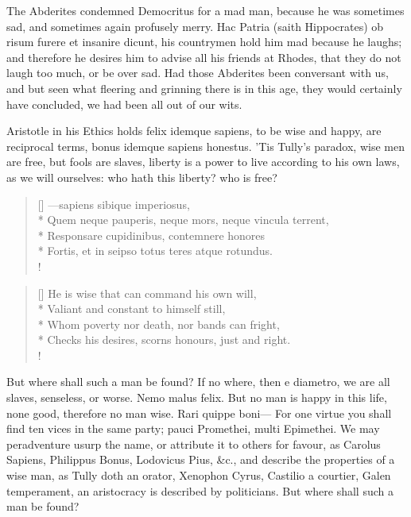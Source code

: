 {The Abderites condemned Democritus for a mad man, because he was
sometimes sad, and sometimes again profusely merry. Hac Patria (saith
Hippocrates) ob risum furere et insanire dicunt, his countrymen hold
him mad because he laughs; and therefore he desires him to advise
all his friends at Rhodes, that they do not laugh too much, or be over
sad. Had those Abderites been conversant with us, and but seen what
 fleering and grinning there is in this age, they would certainly
have concluded, we had been all out of our wits.

Aristotle in his Ethics holds felix idemque sapiens, to be wise and
happy, are reciprocal terms, bonus idemque sapiens honestus. 'Tis 
Tully's paradox, wise men are free, but fools are slaves, liberty is a
power to live according to his own laws, as we will ourselves: who hath
this liberty? who is free?

\settowidth{\versewidth}{Quem neque pauperis, neque mors, neque vincula terrent,}
\begin{verse}[\versewidth]
---sapiens sibique imperiosus,\\*
Quem neque pauperis, neque mors, neque vincula terrent,\\*
Responsare cupidinibus, contemnere honores\\*
Fortis, et in seipso totus teres atque rotundus.\\!
\end{verse}

\settowidth{\versewidth}{Checks his desires, scorns honours, just and right.}
\begin{verse}[\versewidth]
He is wise that can command his own will,\\*
Valiant and constant to himself still,\\*
Whom poverty nor death, nor bands can fright,\\*
Checks his desires, scorns honours, just and right.\\!
\end{verse}

But where shall such a man be found? If no where, then e diametro, we
are all slaves, senseless, or worse. Nemo malus felix. But no man is
happy in this life, none good, therefore no man wise. Rari quippe
boni--- For one virtue you shall find ten vices in the same party;
pauci Promethei, multi Epimethei. We may peradventure usurp the name,
or attribute it to others for favour, as Carolus Sapiens, Philippus
Bonus, Lodovicus Pius, \&c., and describe the properties of a wise man,
as Tully doth an orator, Xenophon Cyrus, Castilio a courtier, Galen
temperament, an aristocracy is described by politicians. But where
shall such a man be found?

}
